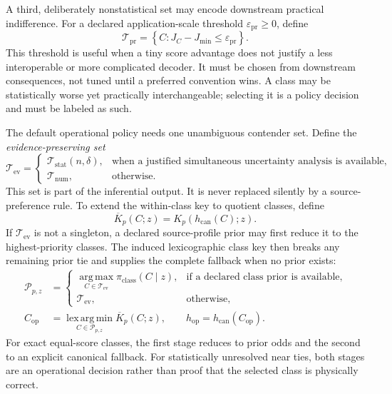 \documentclass[11pt]{article}
\newcommand{\lexargmin}{\operatorname*{lex\,arg\,min}}
\newcommand{\set}[1]{\left\{ #1 \right\}}
\begin{document}
    A third, deliberately nonstatistical set may encode downstream practical indifference.
    For a declared application-scale threshold $\varepsilon_{\mathrm{pr}}\ge0$, define
    \begin{equation}
        \mathcal T_{\mathrm{pr}}
        =\set{C:J_C-J_{\min}\le\varepsilon_{\mathrm{pr}}}.
        \label{eq:practical-tie-set}
    \end{equation}
    This threshold is useful when a tiny score advantage does not justify a less interoperable
    or more complicated decoder. It must be chosen from downstream consequences, not tuned
    until a preferred convention wins. A class may be statistically worse yet practically
    interchangeable; selecting it is a policy decision and must be labeled as such.

    The default operational policy needs one unambiguous contender set. Define the
    \emph{evidence-preserving set}
    \begin{equation}
        \mathcal T_{\mathrm{ev}}
        =
        \begin{cases}
            \mathcal T_{\mathrm{stat}}(n,\delta),
            & \text{when a justified simultaneous uncertainty analysis is available},\\
            \mathcal T_{\mathrm{num}},
            & \text{otherwise}.
        \end{cases}
        \label{eq:evidence-preserving-set}
    \end{equation}
    This set is part of the inferential output. It is never replaced silently by a
    source-preference rule. To extend the within-class key to quotient classes, define
    \begin{equation}
        \overline K_p(C;z)=K_p\!\left(h_{\mathrm{can}}(C);z\right).
    \end{equation}
    If $\mathcal T_{\mathrm{ev}}$ is not a singleton, a declared source-profile prior may
    first reduce it to the highest-priority classes. The induced lexicographic class key then
    breaks any remaining prior tie and supplies the complete fallback when no prior exists:
    \begin{align}
        \mathcal P_{p,z}
        &=
        \begin{cases}
            \displaystyle\operatorname*{arg\,max}_{C\in\mathcal T_{\mathrm{ev}}}
            \pi_{\mathrm{class}}(C\mid z),
            & \text{if a declared class prior is available},\\[6pt]
            \mathcal T_{\mathrm{ev}},
            & \text{otherwise},
        \end{cases}\\
        C_{\mathrm{op}}
        &=\lexargmin_{C\in\mathcal P_{p,z}}\overline K_p(C;z),
        \qquad
        h_{\mathrm{op}}=h_{\mathrm{can}}(C_{\mathrm{op}}).
        \label{eq:default-operational-selection}
    \end{align}
    For exact equal-score classes, the first stage reduces to prior odds and the second to an
    explicit canonical fallback. For statistically unresolved near ties, both stages are an
    operational decision rather than proof that the selected class is physically correct.
\end{document}
